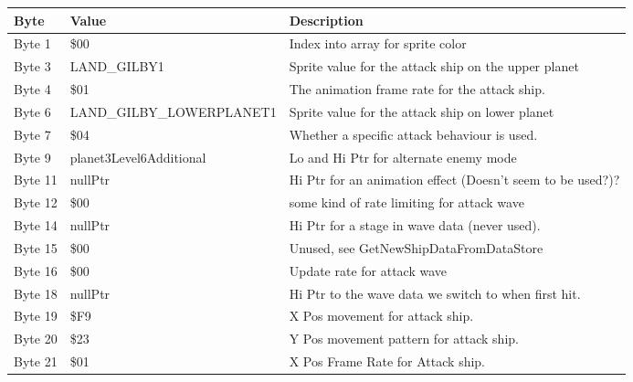 \begin{figure}[H]
  {
  \setlength{\tabcolsep}{3.0pt}
  \setlength\cmidrulewidth{\heavyrulewidth} %
  \begin{adjustbox}{width=12cm}

\begin{tabular}{lll}
\toprule
 Byte    & Value                   & Description                                                        \\
\midrule
 Byte 1  & \$00                     & Index into array for sprite color                                  \\
 Byte 3  & LAND\_GILBY1             & Sprite value for the attack ship on the upper planet               \\
 Byte 4  & \$01                     & The animation frame rate for the attack ship.                      \\
 Byte 6  & LAND\_GILBY\_LOWERPLANET1 & Sprite value for the attack ship on lower planet                   \\
 Byte 7  & \$04                     & Whether a specific attack behaviour is used.                       \\
 Byte 9  & planet3Level6Additional & Lo and Hi Ptr for alternate enemy mode                             \\
 Byte 11 & nullPtr                 & Hi Ptr for an animation effect (Doesn't seem to be used?)?         \\
 Byte 12 & \$00                     & some kind of rate limiting for attack wave                         \\
 Byte 14 & nullPtr                 & Hi Ptr for a stage in wave data (never used).                      \\
 Byte 15 & \$00                     & Unused, see GetNewShipDataFromDataStore                            \\
 Byte 16 & \$00                     & Update rate for attack wave                                        \\
 Byte 18 & nullPtr                 & Hi Ptr to the wave data we switch to when first hit.               \\
 Byte 19 & \$F9                     & X Pos movement for attack ship.                                    \\
 Byte 20 & \$23                     & Y Pos movement pattern for attack ship.                            \\
 Byte 21 & \$01                     & X Pos Frame Rate for Attack ship.                                  \\

\end{tabular}
\end{adjustbox}}
\end{figure}
